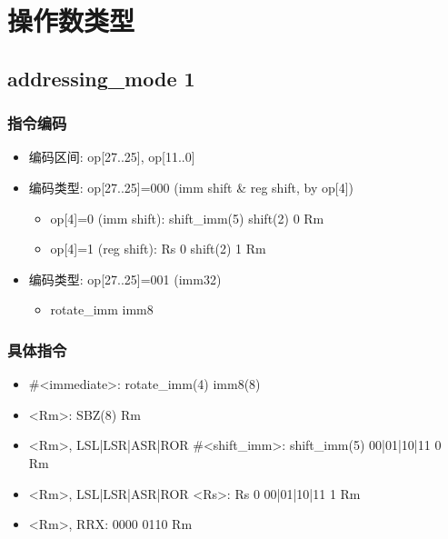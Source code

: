 \documentclass[10pt]{book}
\begin{document}
\section{操作数类型}
\subsection{addressing\_mode 1}
\subsubsection{指令编码}
\begin{itemize}
  \item 编码区间: op[27..25], op[11..0]
  \item 编码类型: op[27..25]=000 (imm shift \& reg shift, by op[4])
  \begin{itemize}
    \item op[4]=0 (imm shift): shift\_imm(5) shift(2) 0 Rm
    \item op[4]=1 (reg shift): Rs 0 shift(2) 1 Rm
  \end{itemize}
  \item 编码类型: op[27..25]=001 (imm32)
  \begin{itemize}
    \item rotate\_imm imm8
  \end{itemize}
\end{itemize}

\subsubsection{具体指令}
\begin{itemize}
  \item \#<immediate>: rotate\_imm(4) imm8(8)
  \item <Rm>: SBZ(8) Rm
  \item <Rm>, LSL|LSR|ASR|ROR \#<shift\_imm>: shift\_imm(5) 00|01|10|11 0 Rm
  \item <Rm>, LSL|LSR|ASR|ROR <Rs>: Rs 0 00|01|10|11 1 Rm
  \item <Rm>, RRX: 0000 0110 Rm
\end{itemize}
\end{document}
